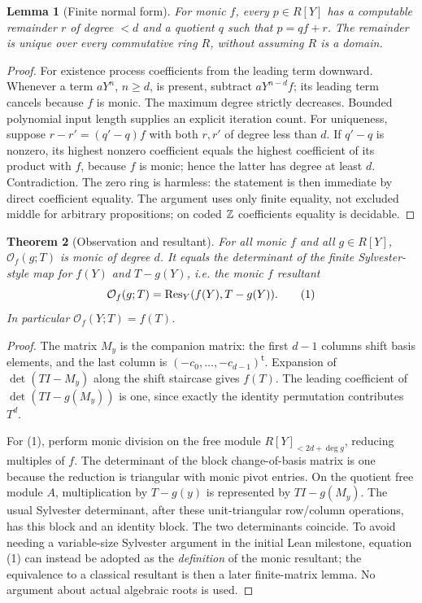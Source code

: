 \documentclass[11pt]{article}
\newtheorem{theorem}{Theorem}[section]
\newtheorem{lemma}[theorem]{Lemma}
\begin{document}
\begin{lemma}[Finite normal form]
For monic \(f\), every \(p\in R[Y]\) has a computable remainder \(r\) of degree \(<d\) and a quotient \(q\) such that \(p=qf+r\). The remainder is unique over every commutative ring \(R\), without assuming \(R\) is a domain.
\end{lemma}
\begin{proof}
For existence process coefficients from the leading term downward. Whenever a term \(aY^n\), \(n\ge d\), is present, subtract \(aY^{n-d}f\); its leading term cancels because \(f\) is monic. The maximum degree strictly decreases. Bounded polynomial input length supplies an explicit iteration count. For uniqueness, suppose \(r-r'=(q'-q)f\) with both \(r,r'\) of degree less than \(d\). If \(q'-q\) is nonzero, its highest nonzero coefficient equals the highest coefficient of its product with \(f\), because \(f\) is monic; hence the latter has degree at least \(d\). Contradiction. The zero ring is harmless: the statement is then immediate by direct coefficient equality. The argument uses only finite equality, not excluded middle for arbitrary propositions; on coded \(\mathbb Z\) coefficients equality is decidable.
\end{proof}

\begin{theorem}[Observation and resultant]
For all monic \(f\) and all \(g\in R[Y]\), \(\mathcal O_f(g;T)\) is monic of degree \(d\). It equals the determinant of the finite Sylvester-style map for \(f(Y)\) and \(T-g(Y)\), i.e. the monic \(f\) resultant
\[
\mathcal O_f(g;T)=\operatorname{Res}_Y(f(Y),T-g(Y)).\tag{1}
\]
In particular \(\mathcal O_f(Y;T)=f(T)\).
\end{theorem}
\begin{proof}
The matrix \(M_y\) is the companion matrix: the first \(d-1\) columns shift basis elements, and the last column is \((-c_0,\ldots,-c_{d-1})^\mathsf{t}\). Expansion of \(\det(TI-M_y)\) along the shift staircase gives \(f(T)\). The leading coefficient of \(\det(TI-g(M_y))\) is one, since exactly the identity permutation contributes \(T^d\).

For (1), perform monic division on the free module \(R[Y]_{<2d+\deg g}\), reducing multiples of \(f\). The determinant of the block change-of-basis matrix is one because the reduction is triangular with monic pivot entries. On the quotient free module \(A\), multiplication by \(T-g(y)\) is represented by \(TI-g(M_y)\). The usual Sylvester determinant, after these unit-triangular row/column operations, has this block and an identity block. The two determinants coincide. To avoid needing a variable-size Sylvester argument in the initial Lean milestone, equation (1) can instead be adopted as the \emph{definition} of the monic resultant; the equivalence to a classical resultant is then a later finite-matrix lemma. No argument about actual algebraic roots is used.
\end{proof}
\end{document}
